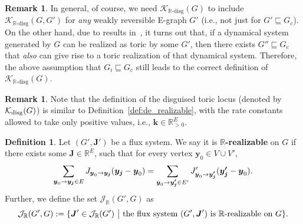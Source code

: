 \documentclass[11pt]{article}
\theoremstyle{plain}
\theoremstyle{definition}
\newtheorem{definition}[theorem]{Definition}
\newtheorem{remark}[theorem]{Remark}
\theoremstyle{remark}
\newcommand\RR{\mathbb{R}}
\newcommand\by{\boldsymbol{y}}
\newcommand\bypj{\boldsymbol{y'_j}}
\newcommand\byj{\boldsymbol{y_j}}
\newcommand\bk{\boldsymbol{k}}
\newcommand\bJ{\boldsymbol{J}}
\newcommand{\mK}{\mathcal{K}}
\newcommand{\dK}{\mathcal{K}_{\RR\text{-disg}}}
\newcommand{\mJ}{\mathcal{J}_{\RR}}
\newcommand{\defi}{\textbf}
\begin{document}

\begin{remark}
In general, of course, we need $\dK (G)$ to include $\dK(G, G')$ for {\em any} weakly reversible E-graph $G'$ (i.e., not just for $G' \sqsubseteq G_{c}$). On the other hand, due to results in~\cite{craciun2020efficient}, it turns out that, if a dynamical system generated by $G$ can be realized as toric by some $G'$, then there exists $G'' \sqsubseteq G_{c}$ that {\em also} can give rise to a toric realization of that dynamical system. Therefore, the above assumption that $G_i \sqsubseteq G_{c}$ still leads to the correct definition of $\dK (G)$. 
\end{remark}

\begin{remark}
Note that the definition of the disguised toric locus (denoted by $\mathcal{K}_{\rm disg}(G)$) is similar to Definition~\ref{def:de_realizable}, with the rate constants allowed to take only positive values, i.e., $\bk \in \mathbb{R}^{E}_{>0}$.
\end{remark}

\begin{definition}
\label{def:flux_realizable}
Let $(G', \bJ')$ be a flux system. We say it is 
\defi{$\RR$-realizable} on $G$ if there exists some $\bJ \in \mathbb{R}^{E}$, such that for every vertex $\by_0 \in V \cup V'$,
\begin{equation} \notag
\sum_{\by_0 \to \byj \in E} J_{\by_0 \to \byj} 
(\byj - \by_0) 
= \sum_{\by_0 \to \bypj \in E'} J'_{\by_0 \to \bypj} 
(\bypj - \by_0).
\end{equation}
Further, we define the set $\mJ (G', G)$ as
\begin{equation} \notag
\mJ (G', G) := \{ \bJ' \in \mJ (G') \ \big| \ \text{the flux system } (G', \bJ') \ \text{is $\RR$-realizable on } G \}.
\end{equation}



\end{definition}
\end{document}
